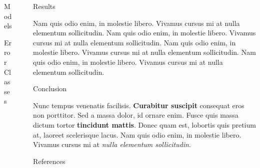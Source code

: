 \documentclass[final]{beamer}
\newlength{\sepwid}
\newlength{\onecolwid}
\begin{document}
\begin{frame}[t]
\begin{columns}[t]
\begin{column}{\onecolwid}
\begin{block}{Models}
\end{block}

\begin{block}{Error Classes}
	

	
\end{block}

\end{column} %

\begin{column}{\sepwid}\end{column} %

\begin{column}{\onecolwid} %

\begin{block}{Results}
	
	Nam quis odio enim, in molestie libero. Vivamus cursus mi at nulla elementum sollicitudin. Nam quis odio enim, in molestie libero. Vivamus cursus mi at nulla elementum sollicitudin.
	Nam quis odio enim, in molestie libero. Vivamus cursus mi at nulla elementum sollicitudin. Nam quis odio enim, in molestie libero. Vivamus cursus mi at nulla elementum sollicitudin.
	
	
\end{block}


\begin{block}{Conclusion}

Nunc tempus venenatis facilisis. \textbf{Curabitur suscipit} consequat eros non porttitor. Sed a massa dolor, id ornare enim. Fusce quis massa dictum tortor \textbf{tincidunt mattis}. Donec quam est, lobortis quis pretium at, laoreet scelerisque lacus. Nam quis odio enim, in molestie libero. Vivamus cursus mi at \textit{nulla elementum sollicitudin}.

\end{block}



\begin{block}{References}

\nocite{*} %
\small{
\vspace{0.75in}}


\end{block}
\end{column}
\end{columns}
\end{frame}
\end{document}
